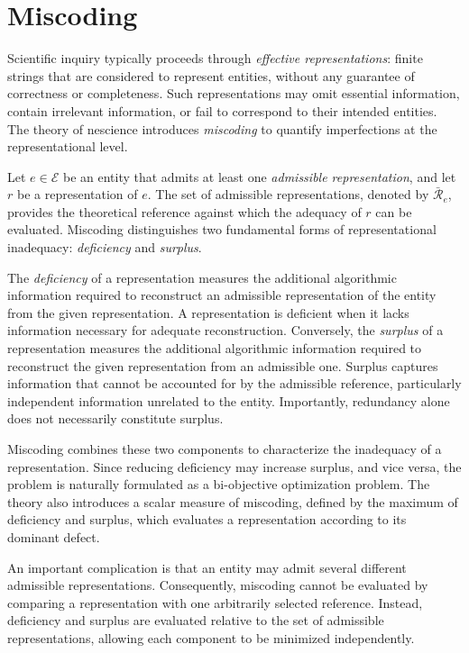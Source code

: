 %
%

\section{Miscoding}
\label{sec:ch1_miscoding}

Scientific inquiry typically proceeds through \emph{effective representations}: finite strings that are considered to represent entities, without any guarantee of correctness or completeness. Such representations may omit essential information, contain irrelevant information, or fail to correspond to their intended entities. The theory of nescience introduces \emph{miscoding} to quantify imperfections at the representational level.

Let $e \in \mathcal{E}$ be an entity that admits at least one \emph{admissible representation}, and let $r$ be a representation of $e$. The set of admissible representations, denoted by $\bar{\mathcal{R}}_e$, provides the theoretical reference against which the adequacy of $r$ can be evaluated. Miscoding distinguishes two fundamental forms of representational inadequacy: \emph{deficiency} and \emph{surplus}.

The \emph{deficiency} of a representation measures the additional algorithmic information required to reconstruct an admissible representation of the entity from the given representation. A representation is deficient when it lacks information necessary for adequate reconstruction. Conversely, the \emph{surplus} of a representation measures the additional algorithmic information required to reconstruct the given representation from an admissible one. Surplus captures information that cannot be accounted for by the admissible reference, particularly independent information unrelated to the entity. Importantly, redundancy alone does not necessarily constitute surplus.

Miscoding combines these two components to characterize the inadequacy of a representation. Since reducing deficiency may increase surplus, and vice versa, the problem is naturally formulated as a bi-objective optimization problem. The theory also introduces a scalar measure of miscoding, defined by the maximum of deficiency and surplus, which evaluates a representation according to its dominant defect.

An important complication is that an entity may admit several different admissible representations. Consequently, miscoding cannot be evaluated by comparing a representation with one arbitrarily selected reference. Instead, deficiency and surplus are evaluated relative to the set of admissible representations, allowing each component to be minimized independently.


